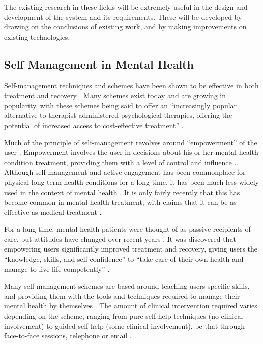\documentclass[11pt,openright,a4paper]{report}
\begin{document}
The existing research in these fields will be extremely useful in the design and development of the system and its requirements. These will be developed by drawing on the conclusions of existing work, and by making improvements on existing technologies.

\subsection{Self Management in Mental Health}
Self-management techniques and schemes have been shown to be effective in both treatment \parencite{wrapstudy} and recovery \parencite{selfmanagementrelapse}. Many schemes exist today and are growing in popularity, with these schemes being said to offer an \enquote{increasingly popular alternative to therapist-administered psychological therapies, offering the potential of increased access to cost-effective treatment} \parencite{selfhelpanxiety}.

Much of the principle of self-management revolves around \enquote{empowerment} of the user \parencite{whoselfmanagement}. Empowerment involves the user in decisions about his or her mental health condition treatment, providing them with a level of control and influence \parencite{whoempowerment}. Although self-management and active engagement has been commonplace for physical long term health conditions for a long time, it has been much less widely used in the context of mental health \parencite{whoselfmanagement}. It is only fairly recently that this has become common in mental health treatment, with claims that it can be as effective as medical treatment \parencite{mhfselfmanagement}.

For a long time, mental health patients were thought of as passive recipients of care, but attitudes have changed over recent years \parencite{cpselfmanagement}. It was discovered that empowering users significantly improved treatment and recovery, giving users the \enquote{knowledge, skills, and self-confidence} to \enquote{take care of their own health and manage to live life competently} \parencite{vahdatpatientinvolvement}.

Many self-management schemes are based around teaching users specific skills, and providing them with the tools and techniques required to manage their mental health by themselves \parencite{selfmanagementuk}. The amount of clinical intervention required varies depending on the scheme, ranging from pure self help techniques (no clinical involvement) to guided self help (some clinical involvement), be that through face-to-face sessions, telephone or email \parencite{selfhelpanxiety}.
\end{document}
